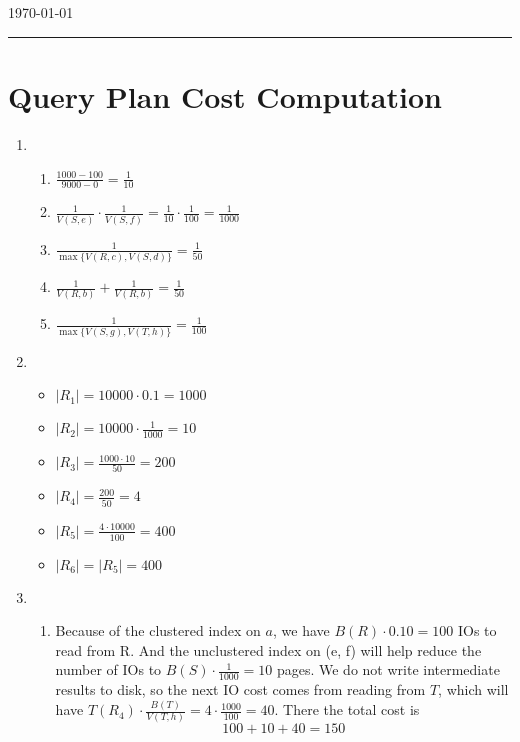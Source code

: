 \documentclass[10pt]{myland}
\begin{document}
\begin{center}
	{\Large {}} \\
	\vspace{.05in}
    \quad{}\\
	\vspace{.05in}
    \today \\
\end{center}
\vspace{.15in} \hrule \vspace{0.5em}%

\section{Query Plan Cost Computation}
\begin{enumerate}[label=\textbf{\arabic*.}, listparindent=0.0em, itemsep=1em]
  \item 
    \begin{enumerate}[label=\textbf{(\alph*)}, listparindent=0.0em, itemsep=1em] 
      \item $\frac{1000 - 100}{9000 - 0} = \frac{1}{10}$
      \item $\frac{1}{V(S, e)}\cdot\frac{1}{V(S, f)} = \frac{1}{10}\cdot\frac{1}{100} = \frac{1}{1000}$
      \item $\frac{1}{\max\{V(R, c), V(S, d)\}} = \frac{1}{50}$
      \item $\frac{1}{V(R, b)} + \frac{1}{V(R, b)} = \frac{1}{50}$
      \item $\frac{1}{\max\{V(S, g), V(T, h)\}} = \frac{1}{100}$
    \end{enumerate}
  \item 
    \begin{itemize}
      \item $|R_1| = 10000\cdot 0.1 = 1000$
      \item $|R_2| = 10000\cdot\frac{1}{1000} = 10$
      \item $|R_3| = \frac{1000\cdot 10}{50} = 200$
      \item $|R_4| = \frac{200}{50} = 4$
      \item $|R_5| = \frac{4\cdot 10000}{100} = 400$
      \item $|R_6| = |R_5| = 400$
    \end{itemize}
  \item 
    \begin{enumerate}[label=\textbf{(\alph*)}, listparindent=0.0em, itemsep=1em] 
      \item Because of the clustered index on $a$, we have $B(R)\cdot 0.10 = 100$ IOs to read from R. And the unclustered index 
        on (e, f) will help reduce the number of IOs to $B(S)\cdot \frac{1}{1000} = 10$ pages. We do not write intermediate results
        to disk, so the next IO cost comes from reading from $T$, which will have $T(R_4) \cdot \frac{B(T)}{V(T, h)} = 4\cdot 
        \frac{1000}{100} = 40$. There the total cost is 
        \[100 + 10 + 40 = 150\]
    \end{enumerate}

\end{enumerate}
\end{document}
